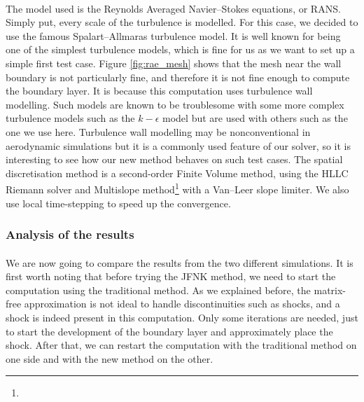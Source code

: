         \paragraph{}
        The model used is the Reynolds Averaged Navier--Stokes equations, or RANS.
        Simply put, every scale of the turbulence is modelled.
        For this case, we decided to use the famous Spalart--Allmaras turbulence model.
        It is well known for being one of the simplest turbulence models, which is fine for us as we want to set up a simple first test case.
        Figure \ref{fig:rae_mesh} shows that the mesh near the wall boundary is not particularly fine, and therefore it is not fine enough to compute the boundary layer.
        It is because this computation uses turbulence wall modelling.
        Such models are known to be troublesome with some more complex turbulence models such as the $k-\epsilon$ model but are used with others such as the one we use here.
        Turbulence wall modelling may be nonconventional in aerodynamic simulations but it is a commonly used feature of our solver, so it is interesting to see how our new method behaves on such test cases.
        The spatial discretisation method is a second-order Finite Volume method, using the HLLC Riemann solver and Multislope method\footnote{} with a Van--Leer slope limiter.
        We also use local time-stepping to speed up the convergence.


      \subsubsection{Analysis of the results}

        \paragraph{}
        We are now going to compare the results from the two different simulations.
        It is first worth noting that before trying the JFNK method, we need to start the computation using the traditional method.
        As we explained before, the matrix-free approximation is not ideal to handle discontinuities such as shocks, and a shock is indeed present in this computation.
        Only some iterations are needed, just to start the development of the boundary layer and approximately place the shock.
        After that, we can restart the computation with the traditional method on one side and with the new method on the other.

